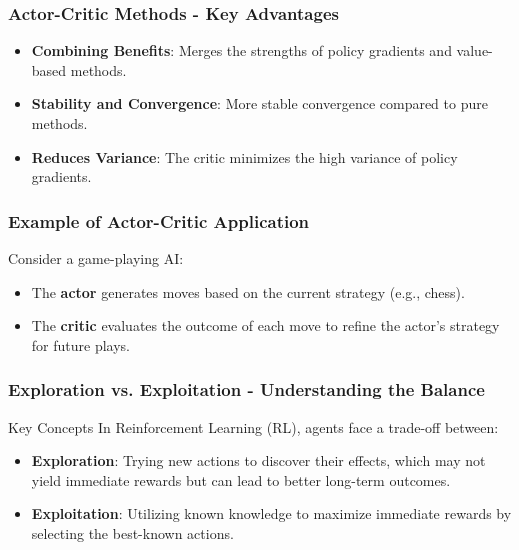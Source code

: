 \documentclass[aspectratio=169]{beamer}
\begin{document}
\begin{frame}[fragile]
    \frametitle{Actor-Critic Methods - Key Advantages}
    \begin{itemize}
        \item \textbf{Combining Benefits}: Merges the strengths of policy gradients and value-based methods.
        \item \textbf{Stability and Convergence}: More stable convergence compared to pure methods.
        \item \textbf{Reduces Variance}: The critic minimizes the high variance of policy gradients.
    \end{itemize}
\end{frame}

\begin{frame}[fragile]
    \frametitle{Example of Actor-Critic Application}
    Consider a game-playing AI:
    \begin{itemize}
        \item The \textbf{actor} generates moves based on the current strategy (e.g., chess).
        \item The \textbf{critic} evaluates the outcome of each move to refine the actor's strategy for future plays.
    \end{itemize}
\end{frame}

\begin{frame}[fragile]
    \frametitle{Exploration vs. Exploitation - Understanding the Balance}
    \begin{block}{Key Concepts}
        In Reinforcement Learning (RL), agents face a trade-off between:
    \end{block}
    
    \begin{itemize}
        \item \textbf{Exploration}: Trying new actions to discover their effects, which may not yield immediate rewards but can lead to better long-term outcomes.
        \item \textbf{Exploitation}: Utilizing known knowledge to maximize immediate rewards by selecting the best-known actions.
    \end{itemize}
\end{frame}
\end{document}
